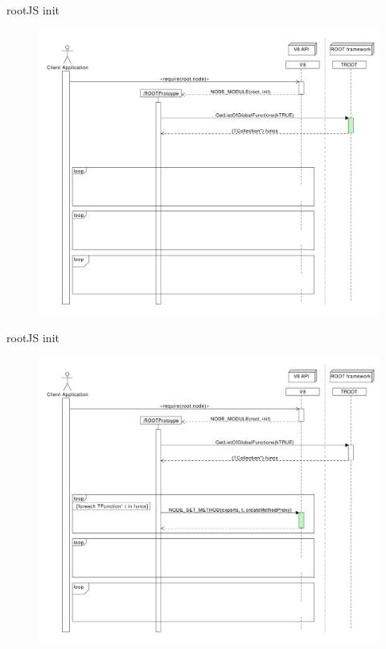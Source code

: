 \begin{frame}{rootJS init}
  \begin{figure}[htb]
    \centering
      \includegraphics[width=\textwidth, height=.85\textheight, keepaspectratio]{./resources/initialize/initialize_h3.pdf}
  \end{figure}
\end{frame}

\begin{frame}{rootJS init}
  \begin{figure}[htb]
    \centering
      \includegraphics[width=\textwidth, height=.85\textheight, keepaspectratio]{./resources/initialize/initialize_h4.pdf}
  \end{figure}
\end{frame}


